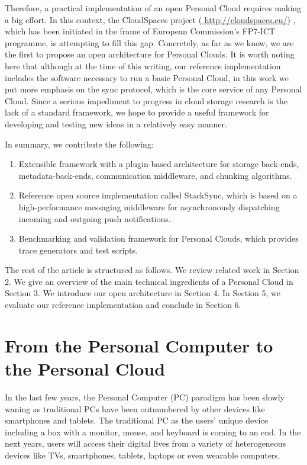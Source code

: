 Therefore, a practical implementation of an open Personal Cloud requires making a big effort. In 
this context, the CloudSpaces project (\url{ http://cloudspaces.eu/}) , which has been initiated
in the frame of European Commission's FP7-ICT programme, is attempting to fill this gap. Concretely,
as far as we know, we are the first to propose an open architecture for Personal Clouds. It is worth
noting here that although at the time of this writing, our reference implementation includes the
software necessary to run a basic Personal Cloud, in this work we put more emphasis on the sync protocol, which
is the core service of any Personal Cloud. Since a serious impediment to progress in cloud storage
research is the lack of a standard framework, we hope to provide a useful framework for developing
and testing new ideas in a relatively easy manner.

In summary, we contribute the following:

\begin{enumerate}
\item Extensible framework with a plugin-based architecture for  storage back-ends, metadata-back-ends,
 communication middleware, and chunking  algorithms.
\item Reference open source implementation called StackSync, which is based on a high-performance messaging middleware 
for asynchronously dispatching incoming and outgoing push notifications.
\item Benchmarking and validation framework for Personal Clouds, which provides trace generators and test scripts. 

\end{enumerate}


The rest of the article is structured as follows. We review related work in Section 2. We give an
overview of the main technical ingredients of a Personal Cloud in Section 3. We introduce our 
open architecture in Section 4. In Section 5, we evaluate our reference implementation and conclude
in Section 6.


\section{From the Personal Computer to the Personal Cloud}

In the last few years, the Personal Computer (PC) paradigm has been slowly waning as traditional PCs have been outnumbered by other devices like smartphones and tablets. The traditional PC as the users' unique device including a box with a monitor, mouse, and keyboard is coming to an end.  In the next years, users will access their digital lives from a variety of heterogeneous devices like TVs, smartphones, tablets, laptops or even wearable computers.


